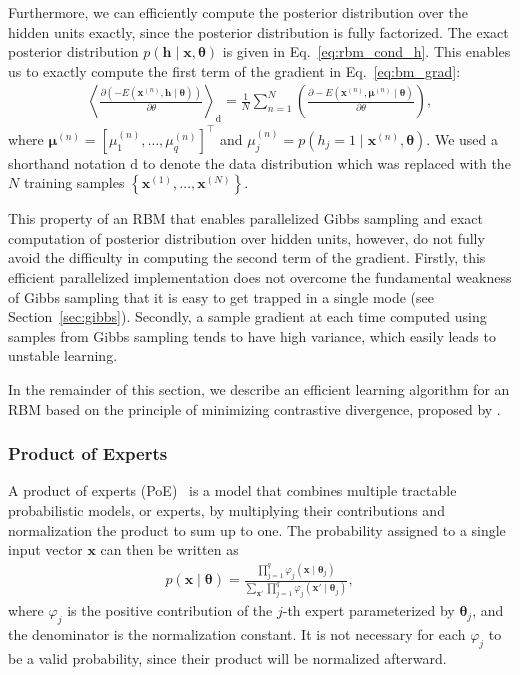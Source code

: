 \documentclass{now}
\newcommand{\vect}[1]{\mathbf{#1}}
\newcommand{\vects}[1]{\boldsymbol{#1}}
\newcommand{\vh}[0]{\vect{h}}
\newcommand{\vx}[0]{\vect{x}}
\newcommand{\td}[0]{\text{d}}
\newcommand{\vmu}[0]{\vects{\mu}}
\newcommand{\TT}[0]{{\vects{\theta}}}
\begin{document}
Furthermore, we can efficiently compute the posterior distribution over the
hidden units exactly, since the posterior distribution is fully factorized. The
exact posterior distribution ${p(\vh \mid \vx, \TT)}$ is given in
Eq.~\eqref{eq:rbm_cond_h}. This enables us to exactly compute the first term of
the gradient in Eq.~\eqref{eq:bm_grad}:
\begin{align}
    \label{eq:rbm_grad}
    \left< \frac{\partial
    \left(-E(\vx^{(n)}, \vh\mid\TT)\right)}{\partial \theta}
    \right>_{\td} = 
    \frac{1}{N} \sum_{n=1}^N \left( \frac{\partial
    -E(\vx^{(n)}, \vmu^{(n)} \mid \TT)}{\partial \theta}
    \right),
\end{align}
where $\vmu^{(n)} = \left[ \mu_1^{(n)}, \dots, \mu_q^{(n)} \right]^\top$ and
$\mu_j^{(n)} = p(h_j=1 \mid \vx^{(n)}, \TT)$. We used a shorthand notation $\td$
to denote the data distribution which was replaced with the $N$ training samples
$\left\{ \vx^{(1)}, \dots, \vx^{(N)}\right\}$. 

This property of an RBM that enables parallelized Gibbs sampling and exact
computation of posterior distribution over hidden units, however, do not fully
avoid the difficulty in computing the second term of the gradient.  Firstly,
this efficient parallelized implementation does not overcome the fundamental
weakness of Gibbs sampling that it is easy to get trapped in a single mode (see
Section~\ref{sec:gibbs}). Secondly, a sample gradient at each time computed
using samples from Gibbs sampling tends to have high variance, which easily
leads to unstable learning.

In the remainder of this section, we describe an efficient learning algorithm
for an RBM based on the principle of minimizing contrastive divergence, proposed
by \citet{Hinton2002}. 



\subsubsection{Product of Experts}
\label{sec:poe}

A product of experts (PoE)~\citep{Hinton2002} is a model that combines multiple tractable
probabilistic models, or experts, by multiplying their contributions and
normalization the product to sum up to one. The probability assigned to a single
input vector $\vx$ can then be written as
\begin{align}
    \label{eq:poe}
    p(\vx \mid \TT) = \frac{\prod_{j=1}^q \varphi_j(\vx \mid
    \TT_j)}{\sum_{\vx'} \prod_{j=1}^q \varphi_j(\vx' \mid
    \TT_j)},
\end{align}
where $\varphi_j$ is the positive contribution of the $j$-th expert
parameterized by $\TT_j$, and the denominator is the normalization constant. It
is not necessary for each $\varphi_j$ to be a valid probability, since their
product will be normalized afterward.
\end{document}
